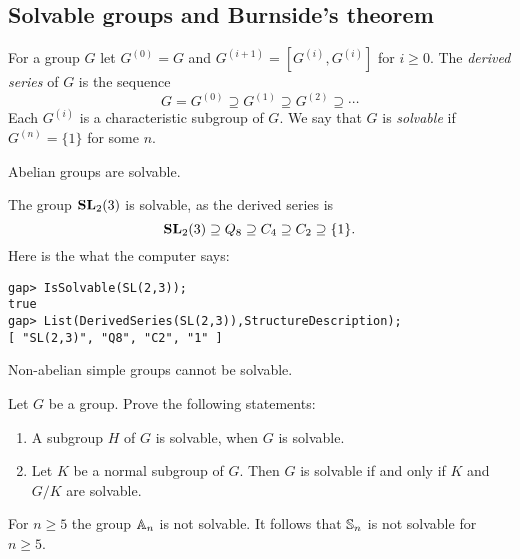 \section{}

\subsection{Solvable groups and Burnside's theorem}

For a group $G$ let 
$G^{(0)}=G$ and 
$G^{(i+1)}=[G^{(i)},G^{(i)}]$ for $i\geq0$.
The \emph{derived series} of $G$ is the sequence
\[
G=G^{(0)}\supseteq G^{(1)}\supseteq G^{(2)}\supseteq\cdots
\]
Each $G^{(i)}$ is a characteristic subgroup of $G$. We say that 
$G$ is \emph{solvable} if $G^{(n)}=\{1\}$ for some $n$.  

\begin{example}
	Abelian groups are solvable. 
\end{example}

\begin{example}
	The group $\mathbf{SL}_2(3)$ is solvable, as the derived series is 
	\[
	\mathbf{SL}_2(3)\supseteq Q_8\supseteq C_4\supseteq C_2\supseteq \{1\}.
	\]
	Here is the what the computer says:
\begin{lstlisting}
gap> IsSolvable(SL(2,3));
true
gap> List(DerivedSeries(SL(2,3)),StructureDescription);
[ "SL(2,3)", "Q8", "C2", "1" ]
\end{lstlisting}
\end{example}

\begin{example}
	Non-abelian simple groups cannot be solvable. 
\end{example}

\begin{exercise}
	\label{xca:solvable}
	Let $G$ be a group. Prove the following statements:
	\begin{enumerate}
		\item A subgroup $H$ of $G$ is solvable, when $G$ is solvable.
		\item Let $K$ be a normal subgroup of $G$. 
		    Then $G$ is solvable if and only if $K$ and $G/K$ are solvable.
	\end{enumerate}
\end{exercise}

\begin{example}
	For $n\geq5$ the group $\mathbb{A}_n$ is not solvable. It follows that 
	$\mathbb{S}_n$ is not solvable for $n\geq5$. 
\end{example}

